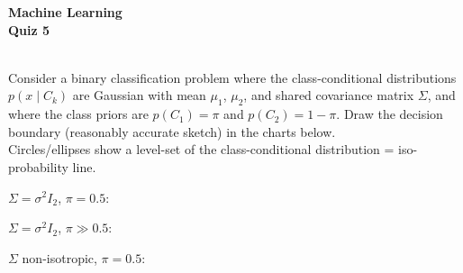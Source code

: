 \documentclass[11pt,noanswers,addpoints]{exam}
\begin{document}
{\Large{\textbf{Machine Learning}}} \\[2mm]
\textbf{\Huge{Quiz 5}}

\hfill\hfill{}\\

Consider a binary classification problem where the class-conditional distributions $p(x\mid C_k)$ are Gaussian with mean $\mu_1$, $\mu_2$, and shared covariance matrix $\Sigma$, and where the class priors are $p(C_1)=\pi$ and $p(C_2)=1-\pi$. Draw the decision boundary (reasonably accurate sketch) in the charts below. \\

Circles/ellipses show a level-set of the class-conditional distribution = iso-probability line.\\

\newcommand{\scalefactor}{0.9}

\begin{questions}
\question[2] $\Sigma=\sigma^2I_2$, $\pi=0.5$:

{\centering\par}\bigskip

\question[1] $\Sigma=\sigma^2I_2$, $\pi\gg0.5$:

{\centering\par}\bigskip

\question[1] $\Sigma$ non-isotropic, $\pi=0.5$:

{\centering\par}

\end{questions}
\end{document}
